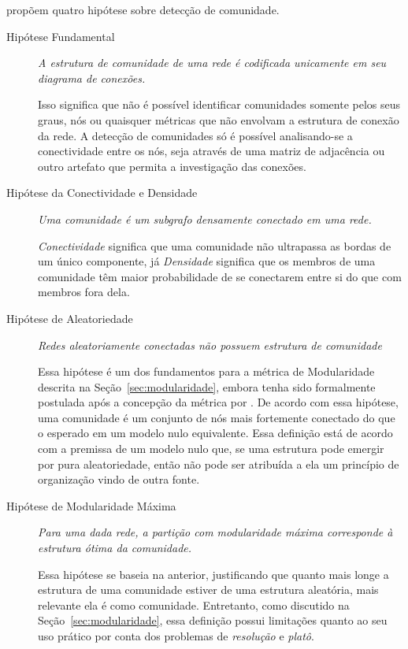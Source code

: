 \documentclass[12pt,a4paper]{article}
\theoremstyle{hypo}
\begin{document}
 propõem quatro hipótese sobre detecção de comunidade.

\begin{description}
\item [Hipótese Fundamental] \textit{A estrutura de comunidade de uma rede é codificada unicamente em seu diagrama de conexões.}

Isso significa que não é possível identificar comunidades somente pelos seus graus, nós ou quaisquer métricas que não envolvam a estrutura de conexão da rede. A detecção de comunidades só é possível analisando-se a conectividade entre os nós, seja através de uma matriz de adjacência ou outro artefato que permita a investigação das conexões.

\item [Hipótese da Conectividade e Densidade] \textit{Uma comunidade é um subgrafo densamente conectado em uma rede.}

\textit{Conectividade} significa que uma comunidade não ultrapassa as bordas de um único componente, já \textit{Densidade} significa que os membros de uma comunidade têm maior probabilidade de se conectarem entre si do que com membros fora dela.

\item [Hipótese de Aleatoriedade] \textit{Redes aleatoriamente conectadas não possuem estrutura de comunidade}

Essa hipótese é um dos fundamentos para a métrica de Modularidade descrita na Seção~\ref{sec:modularidade}, embora tenha sido formalmente postulada após a concepção da métrica por . De acordo com essa hipótese, uma comunidade é um conjunto de nós mais fortemente conectado do que o esperado em um modelo nulo equivalente. Essa definição está de acordo com a premissa de um modelo nulo que, se uma estrutura pode emergir por pura aleatoriedade, então não pode ser atribuída a ela um princípio de organização vindo de outra fonte.

\item [Hipótese de Modularidade Máxima] \textit{Para uma dada rede, a partição com modularidade máxima corresponde à estrutura ótima da comunidade.}

Essa hipótese se baseia na anterior, justificando que quanto mais longe a estrutura de uma comunidade estiver de uma estrutura aleatória, mais relevante ela é como comunidade. Entretanto, como discutido na Seção~\ref{sec:modularidade}, essa definição possui limitações quanto ao seu uso prático por conta dos problemas de \textit{resolução} e \textit{platô}.

\end{description}
\end{document}
